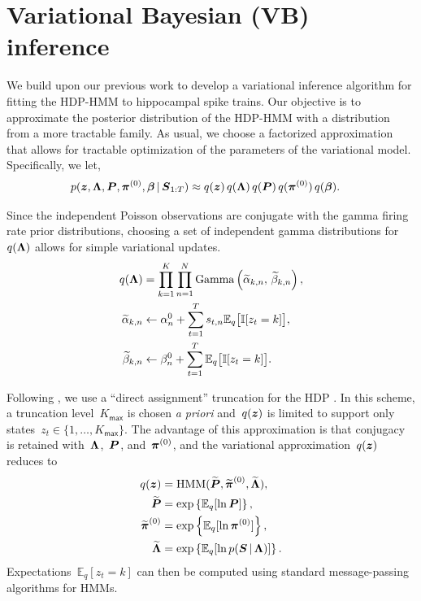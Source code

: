 \section{Variational Bayesian (VB) inference}



We build upon our previous work \citep{Chen12a,Chen14,Johnson14} to
develop a variational inference algorithm for fitting the HDP-HMM to
hippocampal spike trains. Our objective is to approximate the
posterior distribution of the HDP-HMM with a distribution from a more
tractable family. As usual, we choose a factorized approximation that
allows for tractable optimization of the parameters of the variational
model. Specifically, we let,
\begin{align*}
  p(\boldsymbol{z}, \boldsymbol{\Lambda}, \boldsymbol{P}, \boldsymbol{\pi}^{(0)}, \boldsymbol{\beta} \,|\, \boldsymbol{S}_{1:T}) 
  &\approx q(\boldsymbol{z}) \, q(\boldsymbol{\Lambda}) \, q(\boldsymbol{P}) \, q(\boldsymbol{\pi}^{(0)}) \, q(\boldsymbol{\beta}).
\end{align*}

Since the independent Poisson observations are conjugate with the
gamma firing rate prior distributions, choosing a set of independent
gamma distributions for~$q(\boldsymbol{\Lambda})$ allows for simple variational
updates.
\begin{align*}
  q(\boldsymbol{\Lambda}) &= \prod_{k=1}^K \prod_{n=1}^N \mathrm{Gamma}\left(\widetilde{\alpha}_{k,n},\, \widetilde{\beta}_{k,n} \right), \\
  \widetilde{\alpha}_{k,n} &\leftarrow \alpha_n^{0} + \sum_{t=1}^T s_{t,n} \mathbb{E}_q\big[\mathbb{I}[z_t=k]\big], \\
  \widetilde{\beta}_{k,n} &\leftarrow\beta_n^{0} + \sum_{t=1}^T \mathbb{E}_q\big[\mathbb{I}[z_t=k]\big].
\end{align*}

Following \citep{Johnson14}, we use a ``direct assignment'' truncation
for the HDP \citep{Bryant12, Liang07}. In this scheme, a truncation
level~$K_{\mathsf{max}}$ is chosen {\it a priori} and~$q(\boldsymbol{z})$ is limited to
support only states~${z_t\in\{1,\ldots, K_{\mathsf{max}}\}}$. The advantage of this
approximation is that conjugacy is retained with~$\boldsymbol{\Lambda}$,~$\boldsymbol{P}$,
and~$\boldsymbol{\pi}^{(0)}$, and the variational approximation~$q(\boldsymbol{z})$ reduces
to
\begin{align*}
q(\boldsymbol{z}) &= \mathrm{HMM}(\widetilde{\boldsymbol{P}}, \widetilde{\boldsymbol{\pi}}^{(0)}, \widetilde{\boldsymbol{\Lambda}}), \\
\widetilde{\boldsymbol{P}} &= \exp\left\{\mathbb{E}_q[\ln \boldsymbol{P}]\right\}, \\
\widetilde{\boldsymbol{\pi}}^{(0)} &= \exp\left\{\mathbb{E}_q[\ln \boldsymbol{\pi}^{(0)}]\right\}, \\
\widetilde{\boldsymbol{\Lambda}} &= \exp\left\{\mathbb{E}_q[\ln p(\boldsymbol{S} \,|\, \boldsymbol{\Lambda})]\right\}.
\end{align*}
Expectations~${\mathbb{E}_q[z_t=k]}$ can then be computed using
standard message-passing algorithms for HMMs.


